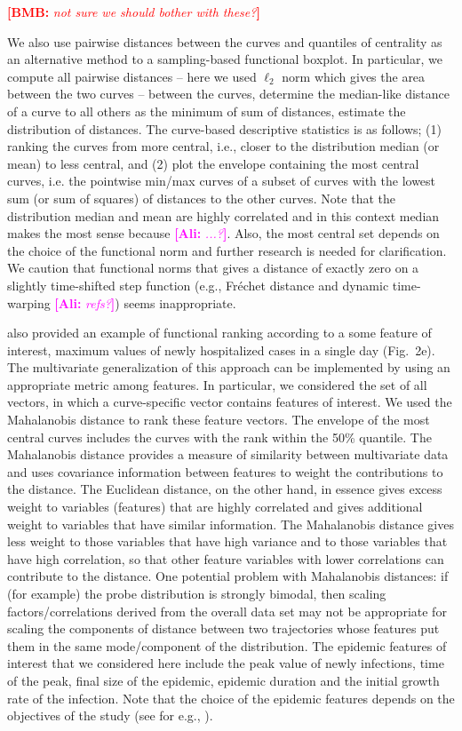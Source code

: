 \documentclass[12pt]{article}
\newcommand{\comment}{\showcomment}
\newcommand{\showcomment}[3]{\textcolor{#1}{\textbf{[#2: }\textsl{#3}\textbf{]}}}
\newcommand{\ali}[1]{\comment{magenta}{Ali}{#1}}
\newcommand{\bmb}[1]{\comment{red}{BMB}{#1}}
\theoremstyle{definition} %
\begin{document}
\bmb{not sure we should bother with these?}

We also use pairwise distances between the curves and quantiles of centrality as an alternative method to a sampling-based functional boxplot. In particular, we compute all pairwise distances -- here we used $\ell_2$ norm which gives the area between the two curves -- between the curves, determine the median-like distance of a curve to all others as the minimum of sum of distances, estimate the distribution of distances. The curve-based descriptive statistics is as follows;
(1) ranking the curves from more central, i.e., closer to the distribution median (or mean) to less central, and (2) plot the envelope containing the most central curves, i.e. the pointwise min/max curves of a subset of curves with the lowest sum (or sum of squares) of distances to the other curves. Note that the distribution median and mean are highly correlated and in this context median makes the most sense because \ali{...?}. Also, the most central set depends on the choice of the functional norm and further research is needed for clarification. We caution that functional norms that gives a distance of exactly zero on a slightly time-shifted step function (e.g., Fréchet distance and dynamic time-warping \ali{refs?}) seems inappropriate.

\cite{juul2021fixed} also provided an example of functional ranking according to a some feature of interest, maximum values of newly hospitalized cases in a single day (Fig.~2e). The multivariate generalization of this approach can be implemented by using an appropriate metric among features. In particular, we considered the set of all vectors, in which a curve-specific vector contains features of interest. We used the Mahalanobis distance \citep{mahalanobis1936generalized} to rank these feature vectors. 
The envelope of the most central curves includes the curves with the rank within the 50\% quantile. The Mahalanobis distance provides a measure of similarity between multivariate data and uses covariance information between features to weight the contributions to the distance. The Euclidean distance, on the other hand, in essence gives excess weight to variables (features) that are highly correlated and gives additional weight to variables that have similar information. The Mahalanobis distance gives less weight to those variables that have high variance and to those variables that have high correlation, so that other feature variables with lower correlations can contribute to the distance. One potential problem with Mahalanobis distances: if (for example) the probe distribution is strongly bimodal, then scaling factors/correlations derived from the overall data set may not be appropriate for scaling the components of distance between two trajectories whose features
put them in the same mode/component of the distribution.  The epidemic features of interest that we considered here include the peak value of newly infections, time of the peak, final size of the epidemic, epidemic duration and the initial growth rate of the infection. Note that the choice of the epidemic features depends on the objectives of the study (see for e.g., \cite{probert2016decision}).
\end{document}
